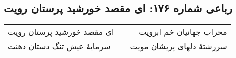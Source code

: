 \begin{center}
\section*{رباعی شماره ۱۷۶: ای مقصد خورشید پرستان رویت}
\label{sec:sh176}
\begin{longtable}{l p{0.5cm} r}
ای مقصد خورشید پرستان رویت
&&
محراب جهانیان خم ابرویت
\\
سرمایهٔ عیش تنگ دستان دهنت
&&
سررشتهٔ دلهای پریشان مویت
\\
\end{longtable}
\end{center}
